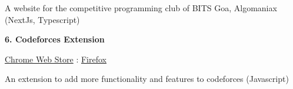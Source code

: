 \documentclass[10pt, letterpaper]{article}
\newenvironment{twocolentry}[2][]{
    \onecolentry
    \def\secondColumn{#2}
    \setcolumnwidth{\fill, 4.7 cm} %
    \begin{paracol}{2}
}{
    \switchcolumn \raggedleft \secondColumn
    \end{paracol}
    \endonecolentry
}
\begin{document}
        \vspace{0.15 cm} %
        A website for the competitive programming club of BITS Goa, Algomaniax (NextJs, Typescript)

        \vspace{0.3 cm} %

        \begin{twocolentry}{
            \href{https://chromewebstore.google.com/detail/codeforces-helper/ahoeafmlmoohkkalcickdnkifpfnolpj}{Chrome Web Store} : \href{https://addons.mozilla.org/en-US/firefox/addon/codeforces-helper/}{Firefox}
        }
            \textbf{6. Codeforces Extension}
        \end{twocolentry}

        \vspace{0.15 cm} %
        An extension to add more functionality and features to codeforces (Javascript)

        \vspace{0.3 cm} %
\end{document}
